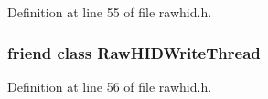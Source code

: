 Definition at line 55 of file rawhid.\-h.

\hypertarget{group___raw_h_i_d_plugin_ga2d3d87c46461ab8d3746b207989bb7f8}{
\subsubsection[{Raw\-H\-I\-D\-Write\-Thread}]{\setlength{\rightskip}{0pt plus 5cm}friend class {\bf Raw\-H\-I\-D\-Write\-Thread}\hspace{0.3cm}{\ttfamily [friend]}}}\label{group___raw_h_i_d_plugin_ga2d3d87c46461ab8d3746b207989bb7f8}


Definition at line 56 of file rawhid.\-h.

